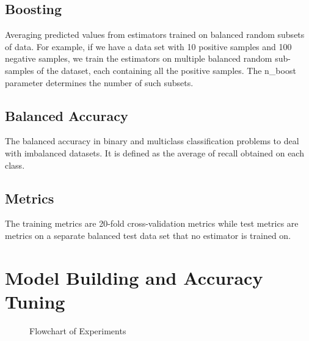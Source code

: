 \documentclass[10pt]{article}
\begin{document}
\subsection{Boosting}
Averaging predicted values from estimators trained on balanced random
subsets of data. For example, if we have a data set with 10 positive
samples and 100 negative samples, we train the estimators on multiple
balanced random sub-samples of the dataset, each containing all the 
positive samples. The n\_boost parameter determines the number of such
subsets.\par
\subsection{Balanced Accuracy}
The balanced accuracy in binary and multiclass classification problems to
deal with imbalanced datasets. It is defined as the average of recall
obtained on each class.\par
\subsection{Metrics}
The training metrics are 20-fold cross-validation metrics while test
metrics are metrics on a separate balanced test data set that no estimator
is trained on.\par
\section{Model Building and Accuracy Tuning}
\begin{figure}[H]
    \centering
    
    \caption{Flowchart of Experiments}
\end{figure}
\end{document}
